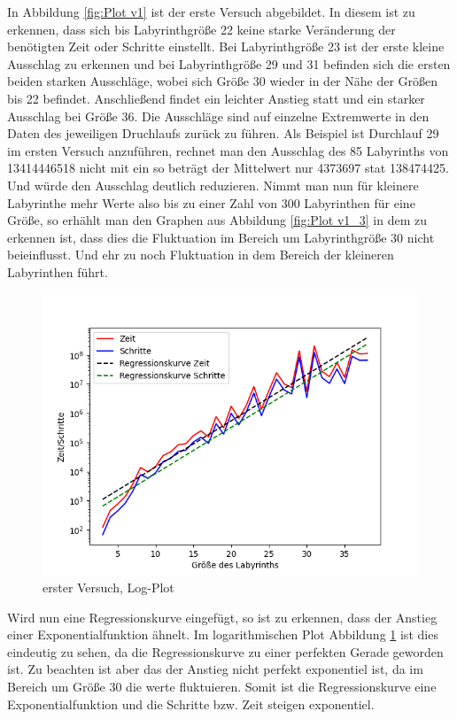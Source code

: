 \documentclass[12pt, a4paper, titlepage]{article}
\begin{document}
In Abbildung \ref{fig:Plot v1} ist der erste Versuch abgebildet.
In diesem ist zu erkennen, dass sich bis Labyrinthgröße 22 keine starke Veränderung der benötigten Zeit oder Schritte einstellt.
Bei Labyrinthgröße 23 ist der erste kleine Ausschlag zu erkennen und bei Labyrinthgröße 29 und 31 befinden sich die ersten beiden starken Ausschläge, wobei sich Größe 30 wieder in der Nähe der Größen bis 22 befindet.
Anschließend findet ein leichter Anstieg statt und ein starker Ausschlag bei Größe 36.
Die Ausschläge sind auf einzelne Extremwerte in den Daten des jeweiligen Druchlaufs zurück zu führen. Als Beispiel ist Durchlauf 29 im ersten Versuch anzuführen, rechnet man den Ausschlag des 85 Labyrinths von 13414446518 nicht mit ein so beträgt der Mittelwert nur 4373697 stat 138474425. Und würde den Ausschlag deutlich reduzieren.
Nimmt man nun für kleinere Labyrinthe mehr Werte also bis zu einer Zahl von 300 Labyrinthen für eine Größe, so erhählt man den Graphen aus Abbildung \ref{fig:Plot v1_3} in dem zu erkennen ist, dass dies die Fluktuation im Bereich um Labyrinthgröße 30 nicht beieinflusst. Und ehr zu noch Fluktuation in dem Bereich der kleineren Labyrinthen führt.

\begin{figure}[t]
	\centering
	\includegraphics[scale=.5]{v1AusLog.png}
	\caption{erster Versuch, Log-Plot}
	\label{fig:Plot v1Log}
\end{figure}

Wird nun eine Regressionskurve eingefügt, so ist zu erkennen, dass der Anstieg einer Exponentialfunktion ähnelt.
Im logarithmischen Plot Abbildung \ref{fig:Plot v1Log} ist dies eindeutig zu sehen, da die Regressionskurve zu einer perfekten Gerade geworden ist.
Zu beachten ist aber das der Anstieg nicht perfekt exponentiel ist, da im Bereich um Größe 30 die werte fluktuieren.
Somit ist die Regressionskurve eine Exponentialfunktion und die Schritte bzw. Zeit steigen exponentiel.
\end{document}
